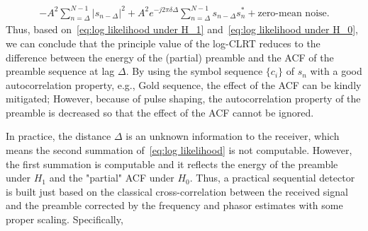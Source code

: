 \begin{equation}
    \label{eq:log likelihood under H_0}
    \begin{aligned}
    -A^2\sum_{n=\Delta}^{N-1}|s_{n-\Delta}|^2+A^2e^{-j2\pi\delta\Delta}\sum_{n=\Delta}^{N-1}s_{n-\Delta}s_n^*+\text{zero-mean noise}.
    \end{aligned}
\end{equation}
Thus, based on~\eqref{eq:log likelihood under H_1} and~\eqref{eq:log likelihood under H_0},
we can conclude that the principle value of the log-CLRT reduces to the difference between
the energy of the (partial) preamble and the ACF of the preamble sequence at lag $\Delta$. 
By using the symbol sequence $\{c_i\}$ of $s_n$ with a good autocorrelation property, e.g., Gold sequence, the
effect of the ACF can be kindly mitigated; However, because of pulse shaping,
the autocorrelation property of the preamble is decreased so that 
the effect of the ACF cannot be ignored. 

In practice, the distance $\Delta$ is an unknown information to the receiver,
which means the second summation of~\eqref{eq:log likelihood} is not computable.
However, the first summation is computable and it reflects the energy of the preamble under
$H_1$ and the "partial" ACF under $H_0$.
Thus, a practical sequential detector is built just based on the classical 
cross-correlation between the received signal
and the preamble corrected by the frequency and phasor estimates with some proper scaling. Specifically,


